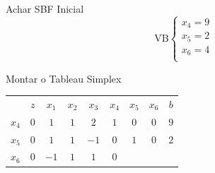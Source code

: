 \begin{frame}
\begin{columns}
\begin{column}{0.7\textwidth}
{\begin{block}{Achar SBF Inicial}
			 		\begin{equation*}
							\text{VB} \left\{\begin{matrix}
							x_4 = 9 \\ 
							x_5 = 2 \\
							x_6 = 4 \\ 
							\end{matrix}\right.
			 		\end{equation*}
		 		\end{block}
	 		}
	 		{
		 		\begin{block}{Montar o Tableau Simplex}
		 			\begin{table}
		 				\begin{tabular}{c c c c c c c c c}
							& \cellcolor{blue!80} \color{white} $ \scriptstyle z$
							& \cellcolor{blue!80} \color{white} $ \scriptstyle x_1$ 
							& \cellcolor{blue!80} \color{white} $ \scriptstyle x_2$
							& \cellcolor{blue!80} \color{white} $ \scriptstyle x_3$
							& \cellcolor{blue!80} \color{red} $ \scriptstyle x_4$
							& \cellcolor{blue!80} \color{red} $ \scriptstyle x_5$
							& \cellcolor{blue!80} \color{red} $ \scriptstyle x_6$ 
							& \cellcolor{blue!80} \color{white} $ \scriptstyle b$ \\
							\cellcolor{blue!80} \color{red} $ \scriptstyle x_4$
							& \cellcolor{yellow!60}  $ \scriptstyle 0$
							& \cellcolor{yellow!60}  $ \scriptstyle 1$ 
							& \cellcolor{yellow!60}  $ \scriptstyle 1$
							& \cellcolor{yellow!60}  $ \scriptstyle 2$
							& \cellcolor{yellow!60}  $ \scriptstyle 1$
							& \cellcolor{yellow!60}  $ \scriptstyle 0$
							& \cellcolor{yellow!60}  $ \scriptstyle 0$ 
							& \cellcolor{yellow!60}  $ \scriptstyle 9$ \\ 
							\cellcolor{blue!80} \color{red} $ \scriptstyle x_5$  
							& \cellcolor{yellow!60}  $ \scriptstyle 0$
							& \cellcolor{yellow!60}  $ \scriptstyle 1$ 
							& \cellcolor{yellow!60}  $ \scriptstyle 1$
							& \cellcolor{yellow!60}  $ \scriptstyle -1$
							& \cellcolor{yellow!60}  $ \scriptstyle 0$
							& \cellcolor{yellow!60}  $ \scriptstyle 1$
							& \cellcolor{yellow!60}  $ \scriptstyle 0$ 
							& \cellcolor{yellow!60}  $ \scriptstyle 2$ \\
							\cellcolor{blue!80} \color{red} $ \scriptstyle x_6$
							& \cellcolor{yellow!60}  $ \scriptstyle 0$
							& \cellcolor{yellow!60}  $ \scriptstyle -1$ 
							& \cellcolor{yellow!60}  $ \scriptstyle 1$
							& \cellcolor{yellow!60}  $ \scriptstyle 1$
							& \cellcolor{yellow!60}  $ \scriptstyle 0$

\end{tabular}
\end{table}
\end{block}}
\end{column}
\end{columns}
\end{frame}
